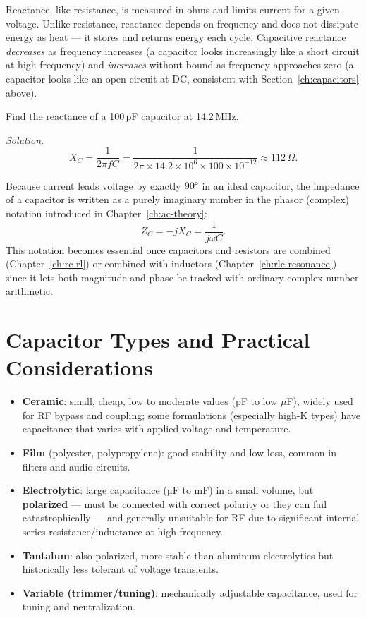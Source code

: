 \begin{keyidea}
Reactance, like resistance, is measured in ohms and limits current for a
given voltage. Unlike resistance, reactance depends on frequency and does
not dissipate energy as heat --- it stores and returns energy each cycle.
Capacitive reactance \emph{decreases} as frequency increases (a
capacitor looks increasingly like a short circuit at high frequency) and
\emph{increases} without bound as frequency approaches zero (a capacitor
looks like an open circuit at DC, consistent with Section~\ref{ch:capacitors}
above).
\end{keyidea}

\begin{examplebox}
Find the reactance of a 100\,pF capacitor at 14.2\,MHz.

\emph{Solution.}
\[
X_C = \frac{1}{2\pi f C} = \frac{1}{2\pi \times 14.2\times10^{6} \times 100\times10^{-12}} \approx 112\,\Omega.
\]
\end{examplebox}

Because current leads voltage by exactly $90\degree$ in an ideal
capacitor, the impedance of a capacitor is written as a purely imaginary
number in the phasor (complex) notation introduced in
Chapter~\ref{ch:ac-theory}:
\[
Z_C = -jX_C = \frac{1}{j\omega C}.
\]
This notation becomes essential once capacitors and resistors are
combined (Chapter~\ref{ch:rc-rl}) or combined with inductors
(Chapter~\ref{ch:rlc-resonance}), since it lets both magnitude and
phase be tracked with ordinary complex-number arithmetic.

\section{Capacitor Types and Practical Considerations}

\begin{itemize}
\item \textbf{Ceramic}: small, cheap, low to moderate values (pF to
low $\mu$F), widely used for RF bypass and coupling; some formulations
(especially high-K types) have capacitance that varies with applied
voltage and temperature.
\item \textbf{Film} (polyester, polypropylene): good stability and low
loss, common in filters and audio circuits.
\item \textbf{Electrolytic}: large capacitance (µF to mF) in a small
volume, but \textbf{polarized} --- must be connected with correct
polarity or they can fail catastrophically --- and generally unsuitable
for RF due to significant internal series resistance/inductance at high
frequency.
\item \textbf{Tantalum}: also polarized, more stable than aluminum
electrolytics but historically less tolerant of voltage transients.
\item \textbf{Variable (trimmer/tuning)}: mechanically adjustable
capacitance, used for tuning and neutralization.
\end{itemize}

